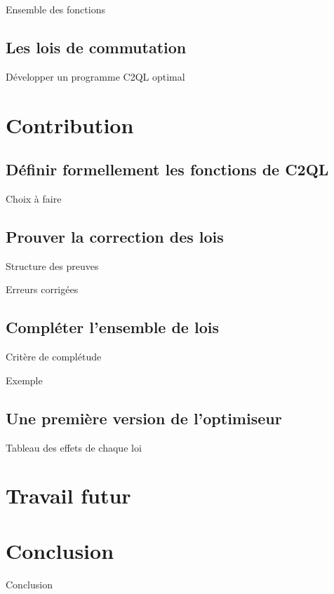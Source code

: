 \documentclass{beamer}
\begin{document}
\begin{frame}{Ensemble des fonctions }
\end{frame}

\subsection{Les lois de commutation}
\begin{frame}{Développer un programme C2QL optimal}
\end{frame}

\section{Contribution}
\subsection{Définir formellement les fonctions de C2QL}
\begin{frame}{Choix à faire}
\end{frame}

\subsection{Prouver la correction des lois}
\begin{frame}{Structure des preuves}
\end{frame}

\begin{frame}{Erreurs corrigées}
\end{frame}

\subsection{Compléter l'ensemble de lois}
\begin{frame}{Critère de complétude}
\end{frame}

\begin{frame}{Exemple}
\end{frame}

\subsection{Une première version de l'optimiseur}
\begin{frame}{Tableau des effets de chaque loi}
\end{frame}

\section{Travail futur}
\begin{frame}
\end{frame}

\section*{Conclusion}
\begin{frame}{Conclusion}
\end{frame}
\end{document}
